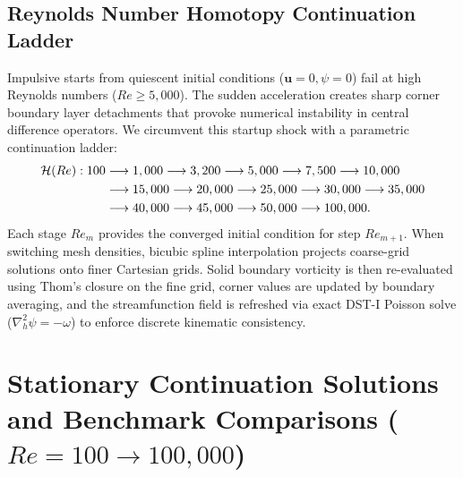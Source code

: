 \documentclass[11pt,a4paper]{article}
\begin{document}
\subsection{Reynolds Number Homotopy Continuation Ladder}
Impulsive starts from quiescent initial conditions ($\mathbf{u} = 0, \psi = 0$) fail at high Reynolds numbers ($Re \ge 5{,}000$). The sudden acceleration creates sharp corner boundary layer detachments that provoke numerical instability in central difference operators. We circumvent this startup shock with a parametric continuation ladder:
\begin{align}
    \mathcal{H}(Re) : 100 &\longrightarrow 1,000 \longrightarrow 3,200 \longrightarrow 5,000 \longrightarrow 7,500 \longrightarrow 10,000 \notag \\
    &\longrightarrow 15,000 \longrightarrow 20,000 \longrightarrow 25,000 \longrightarrow 30,000 \longrightarrow 35,000 \notag \\
    &\longrightarrow 40,000 \longrightarrow 45,000 \longrightarrow 50,000 \longrightarrow 100,000.
\end{align}
Each stage $Re_m$ provides the converged initial condition for step $Re_{m+1}$. When switching mesh densities, bicubic spline interpolation projects coarse-grid solutions onto finer Cartesian grids. Solid boundary vorticity is then re-evaluated using Thom's closure on the fine grid, corner values are updated by boundary averaging, and the streamfunction field is refreshed via exact DST-I Poisson solve ($\nabla_h^2\psi = -\omega$) to enforce discrete kinematic consistency.

\section{Stationary Continuation Solutions and Benchmark Comparisons (\texorpdfstring{$Re = 100 \to 100{,}000$}{Re = 100 to 100000})}
\end{document}
